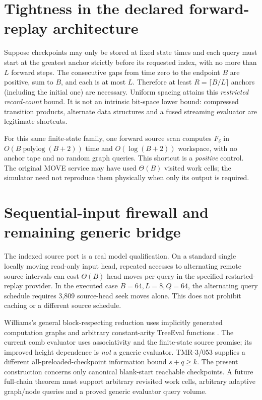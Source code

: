 \documentclass[11pt]{article}
\begin{document}
\section{Tightness in the declared forward-replay architecture}
Suppose checkpoints may only be stored at fixed state times 
and each query must start at the greatest anchor strictly 
before its requested index, with no more than $L$ forward 
steps. The consecutive gaps from time zero to the endpoint 
$B$ are positive, sum to $B$, and each is at most $L$. 
Therefore at least $R=\lceil B/L\rceil$ anchors 
(including the initial one) are necessary. Uniform spacing 
attains this \emph{restricted record-count} bound. It is not
an intrinsic bit-space lower bound: compressed transition 
products, alternate data structures and a fused streaming 
evaluator are legitimate shortcuts.

For this same finite-state family, one forward source scan
computes $F_\delta$ in $O(B\operatorname{polylog}(B+2))$
time and $O(\log(B+2))$ workspace, with no anchor tape 
and no random graph queries. This shortcut is a \emph{positive}
control. The original MOVE service may have used $\Theta(B)$ 
visited work cells; the simulator need not reproduce them 
physically when only its output is required.

\section{Sequential-input firewall and remaining generic bridge}
The indexed source port is a real model qualification. 
On a standard single locally moving read-only input head,
repeated accesses to alternating remote source intervals 
can cost $\Theta(B)$ head moves per query in the specified 
restarted-replay provider. In the executed case 
$B=64,L=8,Q=64$, the alternating query schedule requires 
3,809 source-head seek moves alone. This does not prohibit
caching or a different source schedule.

Williams's general block-respecting reduction uses 
implicitly generated computation graphs and arbitrary 
constant-arity TreeEval functions \cite{Williams2025}.
The current comb evaluator uses associativity and the 
finite-state source promise; its improved height dependence 
is \emph{not} a generic evaluator. TMR-3/053 supplies a 
different all-preloaded-checkpoint information bound 
$s+q\ge k$. The present construction concerns only 
canonical blank-start reachable checkpoints. A future 
full-chain theorem must support arbitrary revisited work 
cells, arbitrary adaptive graph/node queries and a proved 
generic evaluator query volume.
\end{document}

